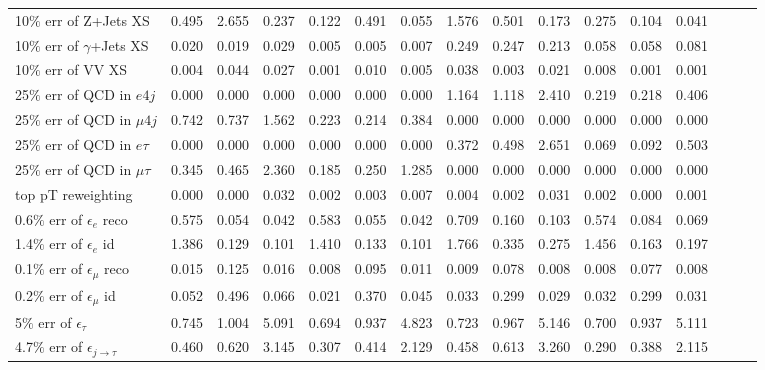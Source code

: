 \begin{table}[]
{\begin{tabular}{|l|ccc|ccc|ccc|ccc|ccc|}
      10$\%$ err of Z+Jets XS                    & 0.495 & 2.655 & 0.237 & 0.122 & 0.491 & 0.055 & 1.576 & 0.501 & 0.173 & 0.275 & 0.104 & 0.041 \\ 
      10$\%$ err of $\gamma$+Jets XS             & 0.020 & 0.019 & 0.029 & 0.005 & 0.005 & 0.007 & 0.249 & 0.247 & 0.213 & 0.058 & 0.058 & 0.081 \\ 
      10$\%$ err of VV XS                        & 0.004 & 0.044 & 0.027 & 0.001 & 0.010 & 0.005 & 0.038 & 0.003 & 0.021 & 0.008 & 0.001 & 0.001 \\ 
      25$\%$ err of QCD in $e 4j$                & 0.000 & 0.000 & 0.000 & 0.000 & 0.000 & 0.000 & 1.164 & 1.118 & 2.410 & 0.219 & 0.218 & 0.406 \\ 
      25$\%$ err of QCD in $\mu 4j$              & 0.742 & 0.737 & 1.562 & 0.223 & 0.214 & 0.384 & 0.000 & 0.000 & 0.000 & 0.000 & 0.000 & 0.000 \\ 
      25$\%$ err of QCD in $e\tau$               & 0.000 & 0.000 & 0.000 & 0.000 & 0.000 & 0.000 & 0.372 & 0.498 & 2.651 & 0.069 & 0.092 & 0.503 \\ 
      25$\%$ err of QCD in $\mu\tau$             & 0.345 & 0.465 & 2.360 & 0.185 & 0.250 & 1.285 & 0.000 & 0.000 & 0.000 & 0.000 & 0.000 & 0.000 \\ 
      top pT reweighting                         & 0.000 & 0.000 & 0.032 & 0.002 & 0.003 & 0.007 & 0.004 & 0.002 & 0.031 & 0.002 & 0.000 & 0.001 \\ 
      0.6$\%$ err of $\epsilon_e$ reco           & 0.575 & 0.054 & 0.042 & 0.583 & 0.055 & 0.042 & 0.709 & 0.160 & 0.103 & 0.574 & 0.084 & 0.069 \\ 
      1.4$\%$ err of $\epsilon_e$ id             & 1.386 & 0.129 & 0.101 & 1.410 & 0.133 & 0.101 & 1.766 & 0.335 & 0.275 & 1.456 & 0.163 & 0.197 \\ 
      0.1$\%$ err of $\epsilon_\mu$ reco         & 0.015 & 0.125 & 0.016 & 0.008 & 0.095 & 0.011 & 0.009 & 0.078 & 0.008 & 0.008 & 0.077 & 0.008 \\ 
      0.2$\%$ err of $\epsilon_\mu$ id           & 0.052 & 0.496 & 0.066 & 0.021 & 0.370 & 0.045 & 0.033 & 0.299 & 0.029 & 0.032 & 0.299 & 0.031 \\ 
      5$\%$ err of $\epsilon_\tau$               & 0.745 & 1.004 & 5.091 & 0.694 & 0.937 & 4.823 & 0.723 & 0.967 & 5.146 & 0.700 & 0.937 & 5.111 \\ 
      4.7$\%$ err of $\epsilon_{j\to\tau}$       & 0.460 & 0.620 & 3.145 & 0.307 & 0.414 & 2.129 & 0.458 & 0.613 & 3.260 & 0.290 & 0.388 & 2.115 \\ 

\end{tabular}}
\end{table}
